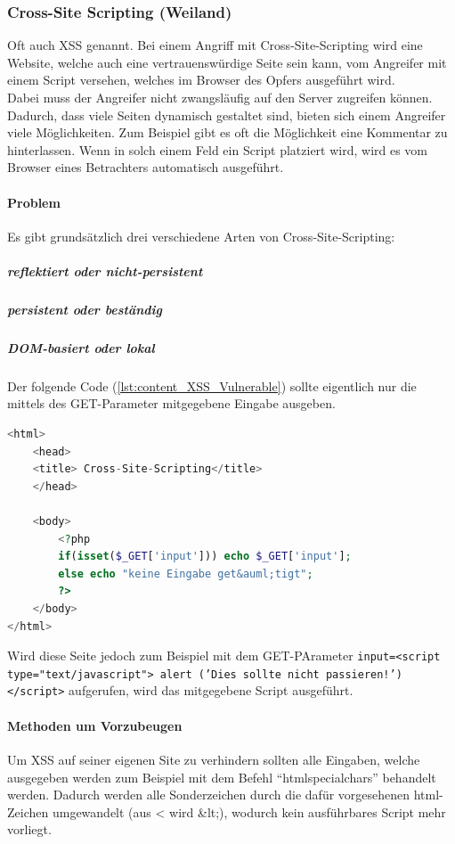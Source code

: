 \subsubsection{Cross-Site Scripting (Weiland)}
Oft auch XSS genannt. Bei einem Angriff mit Cross-Site-Scripting wird eine Website, welche auch eine vertrauenswürdige Seite sein kann, vom Angreifer mit einem Script versehen, welches im Browser des Opfers ausgeführt wird.\\
Dabei muss der Angreifer nicht zwangsläufig auf den Server zugreifen können. Dadurch, dass viele Seiten dynamisch gestaltet sind, bieten sich einem Angreifer viele Möglichkeiten. Zum Beispiel gibt es oft die Möglichkeit eine Kommentar zu hinterlassen. Wenn in solch einem Feld ein Script platziert wird, wird es vom Browser eines Betrachters automatisch ausgeführt.
\paragraph{Problem}
Es gibt grundsätzlich drei verschiedene Arten von Cross-Site-Scripting:
\subparagraph{reflektiert oder nicht-persistent}
\subparagraph{persistent oder beständig}
\subparagraph{DOM-basiert oder lokal}
Der folgende Code (\autoref{lst:content_XSS_Vulnerable}) sollte eigentlich nur die mittels des GET-Parameter mitgegebene Eingabe ausgeben.
\begin{lstlisting}[style=custom, language=PHP, caption={Cross-Site-Scripting Anfällig},label={lst:content_XSS_Vulnerable}]
<html>
	<head>
	<title> Cross-Site-Scripting</title>
	</head>

	<body>
		<?php
		if(isset($_GET['input'])) echo $_GET['input'];
		else echo "keine Eingabe get&auml;tigt";			
		?>
	</body>
</html>
\end{lstlisting}

Wird diese Seite jedoch zum Beispiel mit dem GET-PArameter \texttt{input=<script type="text/javascript"> alert ('Dies sollte nicht passieren!') </script>} aufgerufen, wird das mitgegebene Script ausgeführt.


\paragraph{Methoden um Vorzubeugen}

Um XSS auf seiner eigenen Site zu verhindern sollten alle Eingaben, welche ausgegeben werden zum Beispiel mit dem Befehl \enquote{htmlspecialchars} behandelt werden. Dadurch werden alle Sonderzeichen durch die dafür vorgesehenen html-Zeichen umgewandelt (aus < wird \&lt;), wodurch kein ausführbares Script mehr vorliegt.

